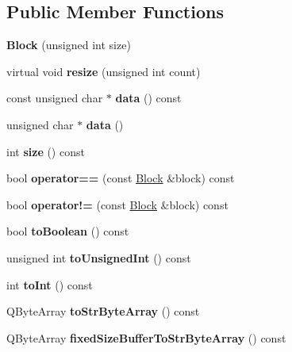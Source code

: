 \subsection*{Public Member Functions}
\begin{DoxyCompactItemize}
\item 
\mbox{\label{class_o_v_e_1_1_block_a0f088b93e9a84ca44028d3121374e1a5}} 
{\bfseries Block} (unsigned int size)
\item 
\mbox{\label{class_o_v_e_1_1_block_a0013d4fe0f85c62b7ba26e861843ea60}} 
virtual void {\bfseries resize} (unsigned int count)
\item 
\mbox{\label{class_o_v_e_1_1_block_a2f914ab3bbb5ff826edcd39b7940c065}} 
const unsigned char $\ast$ {\bfseries data} () const
\item 
\mbox{\label{class_o_v_e_1_1_block_a8c6ea4df6d449aa8f7d7d71e71d5eadb}} 
unsigned char $\ast$ {\bfseries data} ()
\item 
\mbox{\label{class_o_v_e_1_1_block_afbf719da983121924dcbb97be5206c4e}} 
int {\bfseries size} () const
\item 
\mbox{\label{class_o_v_e_1_1_block_a9334df080d67ea96e9dde7b83bb46a9a}} 
bool {\bfseries operator==} (const \hyperlink{class_o_v_e_1_1_block}{Block} \&block) const
\item 
\mbox{\label{class_o_v_e_1_1_block_a35e7f15344805003b5d42f934408a3c2}} 
bool {\bfseries operator!=} (const \hyperlink{class_o_v_e_1_1_block}{Block} \&block) const
\item 
\mbox{\label{class_o_v_e_1_1_block_a91fcd706e9c79187aba6f5f0019b3416}} 
bool {\bfseries to\+Boolean} () const
\item 
\mbox{\label{class_o_v_e_1_1_block_a07f4403a8af292573778d4932733cb8d}} 
unsigned int {\bfseries to\+Unsigned\+Int} () const
\item 
\mbox{\label{class_o_v_e_1_1_block_a1c191fdbe0145cb09ec706bf0fff1cf2}} 
int {\bfseries to\+Int} () const
\item 
\mbox{\label{class_o_v_e_1_1_block_a56208665a5a49b64c7cf4988950f94cf}} 
Q\+Byte\+Array {\bfseries to\+Str\+Byte\+Array} () const
\item 
\mbox{\label{class_o_v_e_1_1_block_af5c9d9ba29e535301d4794c1d597a91c}} 
Q\+Byte\+Array {\bfseries fixed\+Size\+Buffer\+To\+Str\+Byte\+Array} () const
\end{DoxyCompactItemize}


